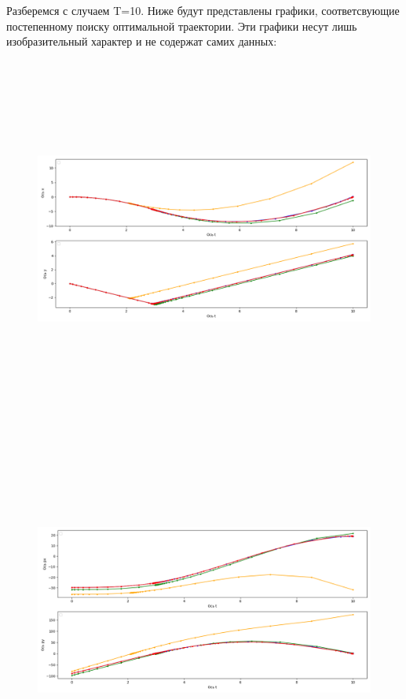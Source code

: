 \documentclass[a4paper,12pt]{article}
\begin{document}
Разберемся с случаем T=10. Ниже будут представлены графики, соответсвующие постепенному поиску оптимальной траектории. Эти графики несут лишь изобразительный характер и не содержат самих данных:
\begin{figure}[H]
    \centering
      \includegraphics[width=\textwidth, height=12cm]{Figure_1.png}
\end{figure}
\begin{figure}[H]
    \centering
      \includegraphics[width=\textwidth, height=12cm]{Figure_2.png}
\end{figure}
\end{document}
